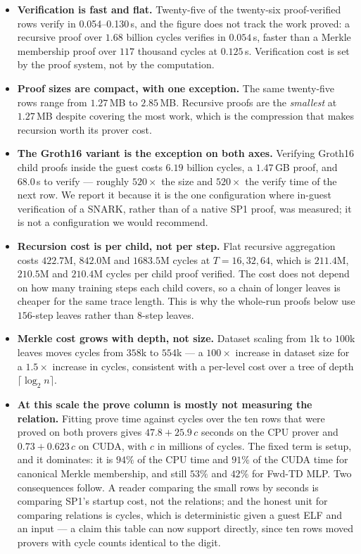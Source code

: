 \begin{itemize}[leftmargin=1.5em]
  \item \textbf{Verification is fast and flat.} Twenty-five of the twenty-six
  proof-verified rows verify in 0.054--0.130\,s, and the figure does not track
  the work proved: a recursive proof over $1.68$ billion cycles verifies in
  $0.054$\,s, faster than a Merkle membership proof over $117$ thousand cycles
  at $0.125$\,s. Verification cost is set by the proof system, not by the
  computation.

  \item \textbf{Proof sizes are compact, with one exception.} The same
  twenty-five rows range from $1.27$\,MB to $2.85$\,MB. Recursive proofs are
  the \emph{smallest} at $1.27$\,MB despite covering the most work, which is
  the compression that makes recursion worth its prover cost.

  \item \textbf{The Groth16 variant is the exception on both axes.} Verifying
  Groth16 child proofs inside the guest costs $6.19$ billion cycles, a
  $1.47$\,GB proof, and $68.0$\,s to verify --- roughly $520\times$ the size and
  $520\times$ the verify time of the next row. We report it because it is the one
  configuration where in-guest verification of a SNARK, rather than of a native
  SP1 proof, was measured; it is not a configuration we would recommend.

  \item \textbf{Recursion cost is per child, not per step.} Flat recursive
  aggregation costs $422.7$M, $842.0$M and $1683.5$M cycles at $T = 16, 32, 64$,
  which is $211.4$M, $210.5$M and $210.4$M cycles per child proof verified. The cost
  does not depend on how many training steps each child covers, so a chain of
  longer leaves is cheaper for the same trace length. This is why the whole-run
  proofs below use $156$-step leaves rather than $8$-step leaves.

  \item \textbf{Merkle cost grows with depth, not size.} Dataset scaling from
  $1$k to $100$k leaves moves cycles from $358$k to $554$k --- a $100\times$
  increase in dataset size for a $1.5\times$ increase in cycles, consistent
  with a per-level cost over a tree of depth $\lceil \log_2 n \rceil$.

  \item \textbf{At this scale the prove column is mostly not measuring the
  relation.} Fitting prove time against cycles over the ten rows that were
  proved on both provers gives $47.8 + 25.9\,c$ seconds on the CPU prover and
  $0.73 + 0.623\,c$ on CUDA, with $c$ in millions of cycles. The fixed term is
  setup, and it dominates: it is $94\%$ of the CPU time and $91\%$ of the CUDA
  time for canonical Merkle membership, and still $53\%$ and $42\%$ for Fwd-TD
  MLP. Two consequences follow. A reader comparing the small rows by seconds is
  comparing SP1's startup cost, not the relations; and the honest unit for
  comparing relations is cycles, which is deterministic given a guest ELF and
  an input --- a claim this table can now support directly, since ten rows moved
  provers with cycle counts identical to the digit.
\end{itemize}

